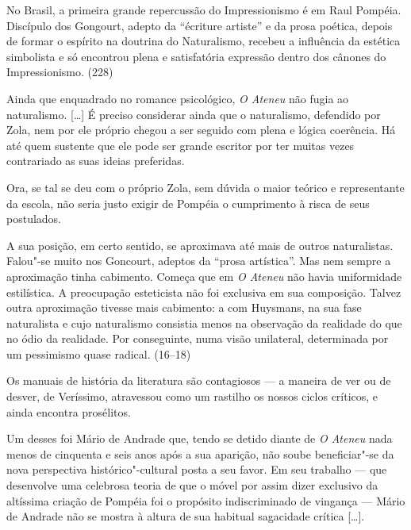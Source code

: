 No Brasil, a primeira grande repercussão do Impressionismo é em Raul
Pompéia. Discípulo dos Gongourt, adepto da ``écriture artiste'' e da
prosa poética, depois de formar o espírito na doutrina do Naturalismo,
recebeu a influência da estética simbolista e só encontrou plena e
satisfatória expressão dentro dos cânones do Impressionismo. (228)



Ainda que enquadrado no romance psicológico,
\textit{O Ateneu} não fugia ao naturalismo.
[\ldots] É preciso considerar ainda que o naturalismo, defendido por Zola,
nem por ele próprio chegou a ser seguido com plena e lógica coerência.
Há até quem sustente que ele pode ser grande escritor por ter muitas
vezes contrariado as suas ideias preferidas.

Ora, se tal se deu com o próprio Zola, sem dúvida o maior teórico e
representante da escola, não seria justo exigir de Pompéia o
cumprimento à risca de seus postulados.

A sua posição, em certo sentido, se aproximava até mais
de outros naturalistas. Falou"-se muito nos Goncourt, adeptos da
``prosa artística''. Mas nem sempre a aproximação tinha cabimento. Começa
que em \textit{O Ateneu} não havia uniformidade estilística. A preocupação esteticista não foi exclusiva
em sua composição. Talvez outra aproximação tivesse mais cabimento: a
com Huysmans, na sua fase naturalista e cujo naturalismo consistia
menos na observação da realidade do que no ódio da realidade. Por
conseguinte, numa visão unilateral, determinada por um pessimismo quase
radical. (16--18)



Os manuais de história da literatura são contagiosos --- a maneira de ver
ou de desver, de Veríssimo, atravessou como um rastilho os nossos
ciclos críticos, e ainda encontra prosélitos.

Um desses foi Mário de Andrade que, tendo se detido
diante de \textit{O Ateneu} nada menos de
cinquenta e seis anos após a sua aparição, não soube beneficiar"-se da
nova perspectiva histórico"-cultural posta a seu favor. Em seu
trabalho --- que desenvolve uma celebrosa teoria de que o móvel por assim
dizer exclusivo da altíssima criação de Pompéia foi o propósito
indiscriminado de vingança --- Mário de Andrade não se mostra à altura de
sua habitual sagacidade crítica [\ldots].

